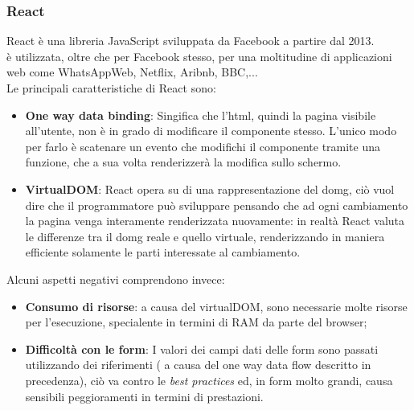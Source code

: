 \subsubsection{React}
React è una libreria JavaScript sviluppata da Facebook a partire dal 2013.\\
è utilizzata, oltre che per Facebook stesso, per una moltitudine di applicazioni web come WhatsAppWeb, Netflix, Aribnb, BBC,...\\
Le principali caratteristiche di React sono:
\begin{itemize}
	\item \textbf{One way data binding}: Singifica che l'\gls{html}, quindi la pagina visibile all'utente, non è in grado di modificare il componente stesso. L'unico modo per farlo è scatenare un evento che modifichi il componente tramite una funzione, che a sua volta renderizzerà la modifica sullo schermo.
	\item \textbf{VirtualDOM}: React opera su di una rappresentazione del \gls{domg}\glsfirstoccur, ciò vuol dire che il programmatore può sviluppare pensando che ad ogni cambiamento la pagina venga interamente renderizzata nuovamente: in realtà React valuta le differenze tra il \gls{domg} reale e quello virtuale, renderizzando in maniera efficiente solamente le parti interessate al cambiamento.
\end{itemize}
Alcuni aspetti negativi comprendono invece:
\begin{itemize}
	\item \textbf{Consumo di risorse}: a causa del virtualDOM, sono necessarie molte risorse per l'esecuzione, specialente in termini di RAM da parte del browser;
	\item \textbf{Difficoltà con le form}: I valori dei campi dati delle form sono passati utilizzando dei riferimenti ( a causa del one way data flow descritto in precedenza), ciò va contro le \emph{best practices} ed, in form molto grandi, causa sensibili peggioramenti in termini di prestazioni.
\end{itemize}
